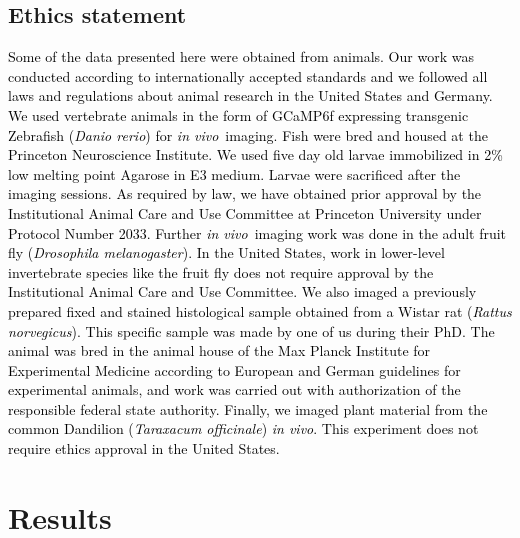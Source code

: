 \documentclass[10pt,letterpaper]{article}
\newcommand{\invivo}{\textit{in vivo}~}
\begin{document}
\subsection*{Ethics statement}
\textcolor{black}{Some of the data presented here were obtained from animals. Our work was conducted according to internationally accepted standards and we followed all laws and regulations about animal research in the United States and Germany. We used vertebrate animals in the form of GCaMP6f expressing transgenic Zebrafish (\textit{Danio rerio}) for \invivo imaging. Fish were bred and housed at the Princeton Neuroscience Institute. We used five day old larvae immobilized in 2\% low melting point Agarose in E3 medium. Larvae were sacrificed after the imaging sessions. As required by law, we have obtained prior approval by the Institutional Animal Care and Use Committee at Princeton University under Protocol Number 2033. Further \invivo imaging work was done in the adult fruit fly (\textit{Drosophila melanogaster}). In the United States, work in lower-level invertebrate species like the fruit fly does not require approval by the Institutional Animal Care and Use Committee. We also imaged a previously prepared fixed and stained histological sample obtained from a Wistar rat (\textit{Rattus norvegicus}). This specific sample was made by one of us during their PhD\cite{Schottdorf2018}. The animal was bred in the animal house of the Max Planck Institute for Experimental Medicine according to European and German guidelines for experimental animals, and work was carried out with authorization of the responsible federal state authority. Finally, we imaged plant material from the common Dandilion (\textit{Taraxacum officinale}) \textit{in vivo}. This experiment does not require ethics approval in the United States.}

\section*{Results}
\end{document}
